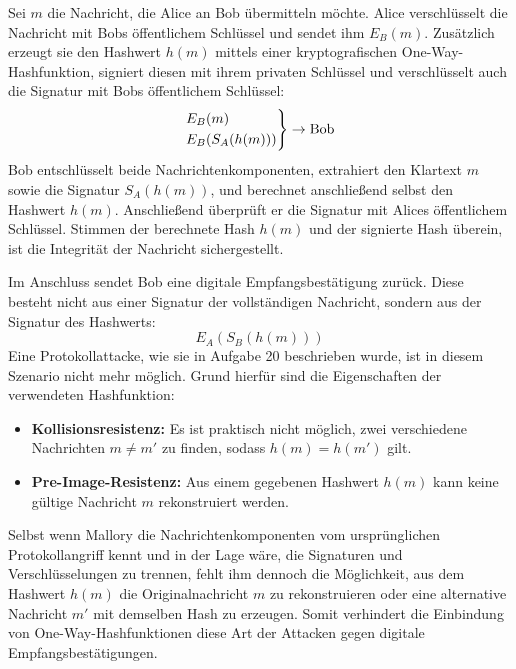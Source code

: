 Sei $m$ die Nachricht, die Alice an Bob übermitteln möchte. Alice verschlüsselt 
die Nachricht mit Bobs öffentlichem Schlüssel und sendet ihm $E_B(m)$. 
Zusätzlich erzeugt sie den Hashwert $h(m)$ mittels einer kryptografischen 
One-Way-Hashfunktion, signiert diesen mit ihrem privaten Schlüssel und 
verschlüsselt auch die Signatur mit Bobs öffentlichem Schlüssel:
\[
    \begin{rcases}
        E_B(m)\\
        E_B(S_A(h(m)))
    \end{rcases}
    \rightarrow \text{Bob}
\]
Bob entschlüsselt beide Nachrichtenkomponenten, extrahiert den Klartext $m$ 
sowie die Signatur $S_A(h(m))$, und berechnet anschließend selbst den Hashwert 
$h(m)$. Anschließend überprüft er die Signatur mit Alices öffentlichem Schlüssel. 
Stimmen der berechnete Hash $h(m)$ und der signierte Hash überein, ist die 
Integrität der Nachricht sichergestellt.

Im Anschluss sendet Bob eine digitale Empfangsbestätigung zurück. Diese besteht 
nicht aus einer Signatur der vollständigen Nachricht, sondern aus der Signatur 
des Hashwerts:
\[
    E_A(S_B(h(m)))
\]
Eine Protokollattacke, wie sie in Aufgabe 20 beschrieben wurde, ist in diesem 
Szenario nicht mehr möglich. Grund hierfür sind die 
Eigenschaften der verwendeten Hashfunktion:
\begin{itemize}
    \item \textbf{Kollisionsresistenz:} Es ist praktisch nicht möglich, zwei verschiedene Nachrichten $m \neq m'$ zu finden, sodass $h(m) = h(m')$ gilt.
    \item \textbf{Pre-Image-Resistenz:} Aus einem gegebenen Hashwert $h(m)$ kann keine gültige Nachricht $m$ rekonstruiert werden.
\end{itemize}
Selbst wenn Mallory die Nachrichtenkomponenten vom 
ursprünglichen Protokollangriff kennt und in der Lage wäre, die Signaturen und 
Verschlüsselungen zu trennen, fehlt ihm dennoch die Möglichkeit, aus dem Hashwert 
$h(m)$ die Originalnachricht $m$ zu rekonstruieren oder eine alternative Nachricht 
$m'$ mit demselben Hash zu erzeugen.
Somit verhindert die Einbindung von One-Way-Hashfunktionen diese Art der 
Attacken gegen digitale Empfangsbestätigungen.